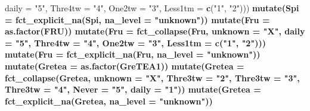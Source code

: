 \documentclass[]{article}
\newenvironment{Shaded}{\begin{snugshade}}{\end{snugshade}}
\newcommand{\CommentTok}[1]{\textcolor[rgb]{0.56,0.35,0.01}{\textit{#1}}}
\newcommand{\DataTypeTok}[1]{\textcolor[rgb]{0.13,0.29,0.53}{#1}}
\newcommand{\KeywordTok}[1]{\textcolor[rgb]{0.13,0.29,0.53}{\textbf{#1}}}
\newcommand{\NormalTok}[1]{#1}
\newcommand{\OperatorTok}[1]{\textcolor[rgb]{0.81,0.36,0.00}{\textbf{#1}}}
\newcommand{\StringTok}[1]{\textcolor[rgb]{0.31,0.60,0.02}{#1}}
\begin{document}
\begin{Shaded}
\begin{Highlighting}[]
{{{{{{{{{{{{{{{{{{{{{{{{{{{{{{{{{{{{{{                            \DataTypeTok{daily =} \StringTok{"5"}\NormalTok{,}
                            \DataTypeTok{Thre4tw =} \StringTok{"4"}\NormalTok{,}
                            \DataTypeTok{One2tw =} \StringTok{"3"}\NormalTok{,}
                            \DataTypeTok{Less1tm =} \KeywordTok{c}\NormalTok{(}\StringTok{"1"}\NormalTok{, }\StringTok{"2"}\NormalTok{))) }\OperatorTok{%
\StringTok{  }\KeywordTok{mutate}\NormalTok{(}\DataTypeTok{Spi =} \KeywordTok{fct_explicit_na}\NormalTok{(Spi, }\DataTypeTok{na_level =} \StringTok{"unknown"}\NormalTok{)) }\OperatorTok{%
\StringTok{  }\KeywordTok{mutate}\NormalTok{(}\DataTypeTok{Fru =} \KeywordTok{as.factor}\NormalTok{(FRU)) }\OperatorTok{%
\StringTok{  }\KeywordTok{mutate}\NormalTok{(}\DataTypeTok{Fru =} \KeywordTok{fct_collapse}\NormalTok{(Fru, }
                            \DataTypeTok{unknown =} \StringTok{"X"}\NormalTok{,}
                            \DataTypeTok{daily =} \StringTok{"5"}\NormalTok{,}
                            \DataTypeTok{Thre4tw =} \StringTok{"4"}\NormalTok{,}
                            \DataTypeTok{One2tw =} \StringTok{"3"}\NormalTok{,}
                            \DataTypeTok{Less1tm =} \KeywordTok{c}\NormalTok{(}\StringTok{"1"}\NormalTok{, }\StringTok{"2"}\NormalTok{))) }\OperatorTok{%
\StringTok{  }\KeywordTok{mutate}\NormalTok{(}\DataTypeTok{Fru =} \KeywordTok{fct_explicit_na}\NormalTok{(Fru, }\DataTypeTok{na_level =} \StringTok{"unknown"}\NormalTok{)) }\OperatorTok{%
\StringTok{  }\KeywordTok{mutate}\NormalTok{(}\DataTypeTok{Gretea =} \KeywordTok{as.factor}\NormalTok{(GreTEA1)) }\OperatorTok{%
\StringTok{  }\KeywordTok{mutate}\NormalTok{(}\DataTypeTok{Gretea =} \KeywordTok{fct_collapse}\NormalTok{(Gretea, }
                               \DataTypeTok{unknown =} \StringTok{"X"}\NormalTok{, }
                               \DataTypeTok{Thre3tw =} \StringTok{"2"}\NormalTok{, }
                               \DataTypeTok{Thre3tw =} \StringTok{"3"}\NormalTok{,}
                               \DataTypeTok{Thre3tw =} \StringTok{"4"}\NormalTok{,}
                               \DataTypeTok{Never =} \StringTok{"5"}\NormalTok{, }
                               \DataTypeTok{daily =} \StringTok{"1"}\NormalTok{)) }\OperatorTok{%
\StringTok{  }\KeywordTok{mutate}\NormalTok{(}\DataTypeTok{Gretea =} \KeywordTok{fct_explicit_na}\NormalTok{(Gretea, }\DataTypeTok{na_level =} \StringTok{"unknown"}\NormalTok{))  }\OperatorTok{%
}}}}}}}}}}}}}}}}}}}}}}}}}}}}}}}}}}}}}}}}}}}}}}
\end{Highlighting}
\end{Shaded}
\end{document}
